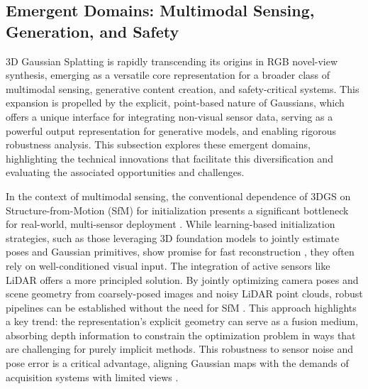 \documentclass[11pt,a4paper]{article}
\begin{document}
\subsection{Emergent Domains: Multimodal Sensing, Generation, and Safety}


3D Gaussian Splatting is rapidly transcending its origins in RGB novel-view synthesis, emerging as a versatile core representation for a broader class of multimodal sensing, generative content creation, and safety-critical systems. This expansion is propelled by the explicit, point-based nature of Gaussians, which offers a unique interface for integrating non-visual sensor data, serving as a powerful output representation for generative models, and enabling rigorous robustness analysis. This subsection explores these emergent domains, highlighting the technical innovations that facilitate this diversification and evaluating the associated opportunities and challenges.

In the context of multimodal sensing, the conventional dependence of 3DGS on Structure-from-Motion (SfM) for initialization presents a significant bottleneck for real-world, multi-sensor deployment \cite{arxiv:2404.12547v2}. While learning-based initialization strategies, such as those leveraging 3D foundation models to jointly estimate poses and Gaussian primitives, show promise for fast reconstruction \cite{arxiv:2607.03209v1}, they often rely on well-conditioned visual input. The integration of active sensors like LiDAR offers a more principled solution. By jointly optimizing camera poses and scene geometry from coarsely-posed images and noisy LiDAR point clouds, robust pipelines can be established without the need for SfM \cite{arxiv:2504.09129v1}. This approach highlights a key trend: the representation's explicit geometry can serve as a fusion medium, absorbing depth information to constrain the optimization problem in ways that are challenging for purely implicit methods. This robustness to sensor noise and pose error is a critical advantage, aligning Gaussian maps with the demands of acquisition systems with limited views \cite{arxiv:2509.11853v2,arxiv:2606.00450v1,arxiv:2504.13204v2}.
\end{document}

